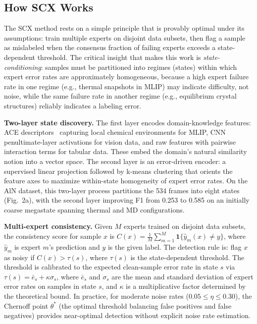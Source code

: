 \subsection{How SCX Works}

The SCX method rests on a simple principle that is provably optimal under its assumptions: train multiple experts on disjoint data subsets, then flag a sample as mislabeled when the consensus fraction of failing experts exceeds a state-dependent threshold. The critical insight that makes this work is \textit{state-conditioning}: samples must be partitioned into regimes (states) within which expert error rates are approximately homogeneous, because a high expert failure rate in one regime (e.g., thermal snapshots in MLIP) may indicate difficulty, not noise, while the same failure rate in another regime (e.g., equilibrium crystal structures) reliably indicates a labeling error.

\textbf{Two-layer state discovery.} The first layer encodes domain-knowledge features: ACE descriptors~\cite{drautz2019ace} capturing local chemical environments for MLIP, CNN penultimate-layer activations for vision data, and raw features with pairwise interaction terms for tabular data. These embed the domain's natural similarity notion into a vector space. The second layer is an error-driven encoder: a supervised linear projection followed by k-means clustering that orients the feature axes to maximize within-state homogeneity of expert error rates. On the AlN dataset, this two-layer process partitions the 534 frames into eight states (Fig.~2a), with the second layer improving F1 from 0.253 to 0.585 on an initially coarse megastate spanning thermal and MD configurations.

\textbf{Multi-expert consistency.} Given $M$ experts trained on disjoint data subsets, the consistency score for sample $x$ is $C(x) = \frac{1}{M}\sum_{m=1}^M \mathbf{1}\{\hat{y}_m(x) \neq y\}$, where $\hat{y}_m$ is expert $m$'s prediction and $y$ is the given label. The detection rule is: flag $x$ as noisy if $C(x) > \tau(s)$, where $\tau(s)$ is the state-dependent threshold. The threshold is calibrated to the expected clean-sample error rate in state $s$ via $\tau(s) = \bar{e}_s + \kappa\sigma_s$, where $\bar{e}_s$ and $\sigma_s$ are the mean and standard deviation of expert error rates on samples in state $s$, and $\kappa$ is a multiplicative factor determined by the theoretical bound. In practice, for moderate noise rates ($0.05 \leq \eta \leq 0.30$), the Chernoff point $\theta^*$ (the optimal threshold balancing false positives and false negatives) provides near-optimal detection without explicit noise rate estimation.

